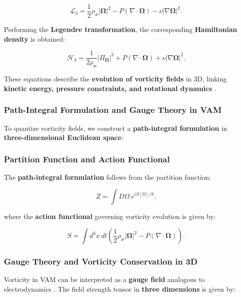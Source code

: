 \documentclass[a4paper,10pt]{article}
\begin{document}
    \begin{equation*}
        \mathcal{L}_3 = \frac{1}{2} \rho_\text{æ} |\boldsymbol{\Omega}|^2 - P (\nabla \cdot \boldsymbol{\Omega}) - \nu |\nabla \boldsymbol{\Omega}|^2.
    \end{equation*}

    Performing the \textbf{Legendre transformation}, the corresponding \textbf{Hamiltonian density} is obtained:

    \begin{equation*}
        \mathcal{H}_3 = \frac{1}{2 \rho_\text{æ}} |\Pi_{\boldsymbol{\Omega}}|^2 + P (\nabla \cdot \boldsymbol{\Omega}) + \nu |\nabla \boldsymbol{\Omega}|^2.
    \end{equation*}

    These equations describe the \textbf{evolution of vorticity fields} in 3D, linking \textbf{kinetic energy, pressure constraints, and rotational dynamics} \cite{lamb1945hydrodynamics}.

    \subsubsection*{Path-Integral Formulation and Gauge Theory in VAM}
    To quantize vorticity fields, we construct a \textbf{path-integral formulation} in \textbf{three-dimensional Euclidean space}:

    \subsubsection*{Partition Function and Action Functional}
    The \textbf{path-integral formulation} follows from the partition function:

    \begin{equation*}
        Z = \int D\Omega \ e^{iS[\Omega]/\hbar}.
    \end{equation*}

    where the \textbf{action functional} governing vorticity evolution is given by:

    \begin{equation*}
        S = \int d^3x \ dt \left( \frac{1}{2} \rho_\text{æ} |\boldsymbol{\Omega}|^2 - P (\nabla \cdot \boldsymbol{\Omega}) \right).
    \end{equation*}

    \subsubsection*{Gauge Theory and Vorticity Conservation in 3D}
    Vorticity in VAM can be interpreted as a \textbf{gauge field} analogous to electrodynamics \cite{jackson1999classical}. The field strength tensor in \textbf{three dimensions} is given by:
\end{document}
